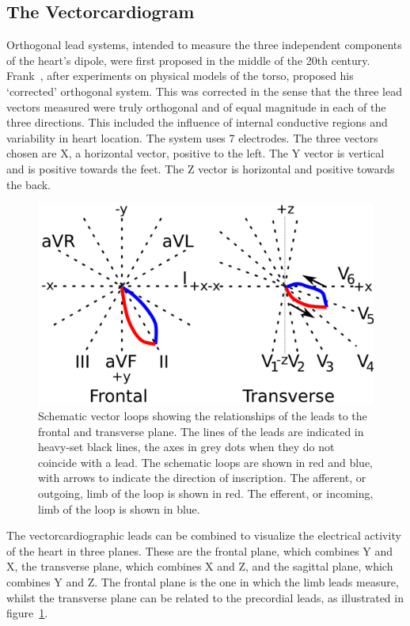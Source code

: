 \subsection{The Vectorcardiogram}

Orthogonal lead systems, intended to measure the three independent components of
the heart's dipole, were first proposed in the middle of the 20th century.
Frank~\cite{Frank1956}, after experiments on physical models of the torso,
proposed his `corrected' orthogonal system.
This was corrected in the sense that the three lead vectors measured were
truly orthogonal and of equal magnitude in each of the three directions.
This included the influence of internal conductive regions and variability in
heart location.
The system uses 7 electrodes.
The three vectors chosen are X, a horizontal vector, positive to the left.
The Y vector is vertical and is positive towards the feet.
The Z vector is horizontal and positive towards the back.

\begin{figure}
\begin{center}
\includegraphics{figures/intro/vector_loops}
\end{center}
\caption[Schematic Vector Loops]{
\label{fig:intro:ecg:planes}
Schematic vector loops showing the relationships of the leads to the frontal and
transverse plane.
The lines of the leads are indicated in heavy-set black lines, the axes in grey
dots when they do not coincide with a lead.
The schematic loops are shown in red and blue, with arrows to indicate the
direction of inscription.
The afferent, or outgoing, limb of the loop is shown in red.
The efferent, or incoming, limb of the loop is shown in blue.
}
\end{figure}

The vectorcardiographic leads can be combined to visualize the electrical
activity of the heart in three planes.
These are the frontal plane, which combines Y and X, the transverse plane, which
combines X and Z, and the sagittal plane, which combines Y and Z.
The frontal plane is the one in which the limb leads measure, whilst the transverse plane
can be related to the precordial leads, as illustrated in
figure~\ref{fig:intro:ecg:planes}.

